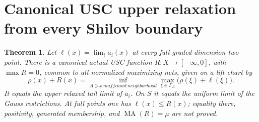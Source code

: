 \documentclass[11pt]{article}
\newtheorem{theorem}{Theorem}
\newcommand{\MA}{\operatorname{MA}}
\begin{document}
\section{Canonical USC upper relaxation from every Shilov boundary}
\begin{theorem}\label{relax}
Let $\ell(x)=\lim_i a_i(x)$ at every full graded-dimension-two point.
There is a canonical actual USC function $R:X\to[-\infty,0]$, with
$\max R=0$, common to all normalized maximizing nets, given on a lift chart by
\begin{equation}\label{shilovrelax}
 \rho(x)+R(x)=\inf_{A\ni x\ {
m affinoid\ neighborhood}}
       \max_{\xi\in\Gamma_A}\bigl(\rho(\xi)+\ell(\xi)\bigr).
\end{equation}
It equals the upper relaxed tail limit of $a_i$. On $S$ it equals the
uniform limit of the Gauss restrictions. At full points one has
$\ell(x)\le R(x)$; equality there, positivity, generated membership,
and $\MA(R)=\mu$ are not proved.
\end{theorem}
\end{document}
